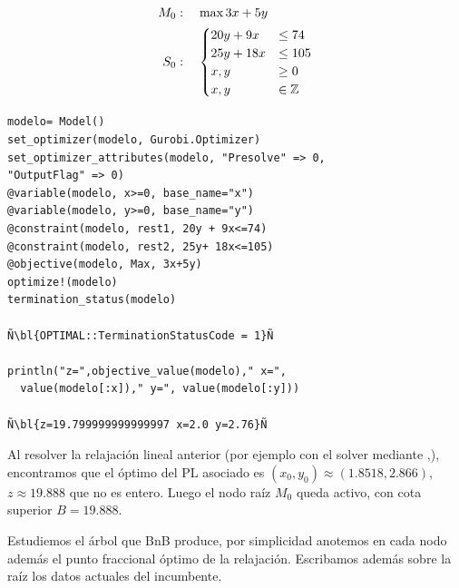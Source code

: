     \NAM{
    \begin{center}
    }{}
    \begin{minipage}{0.2\textwidth}
    \begin{align*}
    M_0&:\quad 	\max 3x+5y\\
    S_0&:\quad \begin{cases}
    20y+9x&\leq 74\\
    25y+18x&\leq 105\\
    x,y&\geq 0\\
    x,y&\in \mathbb Z
    \end{cases}
    \end{align*}
    \end{minipage}
    \NAM{
    \end{center}
    }{}
 	\begin{lstlisting}[escapechar=Ñ]
modelo= Model()
set_optimizer(modelo, Gurobi.Optimizer)
set_optimizer_attributes(modelo, "Presolve" => 0,
"OutputFlag" => 0) 
@variable(modelo, x>=0, base_name="x")
@variable(modelo, y>=0, base_name="y")
@constraint(modelo, rest1, 20y + 9x<=74)
@constraint(modelo, rest2, 25y+ 18x<=105)
@objective(modelo, Max, 3x+5y)
optimize!(modelo)
termination_status(modelo)

Ñ\bl{OPTIMAL::TerminationStatusCode = 1}Ñ

println("z=",objective_value(modelo)," x=",
  value(modelo[:x])," y=", value(modelo[:y]))

Ñ\bl{z=19.799999999999997 x=2.0 y=2.76}Ñ
    \end{lstlisting}
    \NAM{
    \end{minipage}
    \end{center}
    }{
    \end{minipage}
    }
    
        Al resolver la relajación lineal anterior (por ejemplo con el solver \GUROBI mediante \JULIA,), encontramos que el óptimo del PL asociado es $(x_0,y_0)\approx (1.8518, 2.866)$, $z\approx 19.888$ que no es entero. Luego el nodo raíz $M_0$ queda activo, con cota superior $B=19.888$.
        
    Estudiemos el árbol que BnB produce, por simplicidad anotemos en cada nodo además el punto fraccional óptimo de la relajación. Escribamos además sobre la raíz los datos actuales del incumbente.
    \medskip
    
